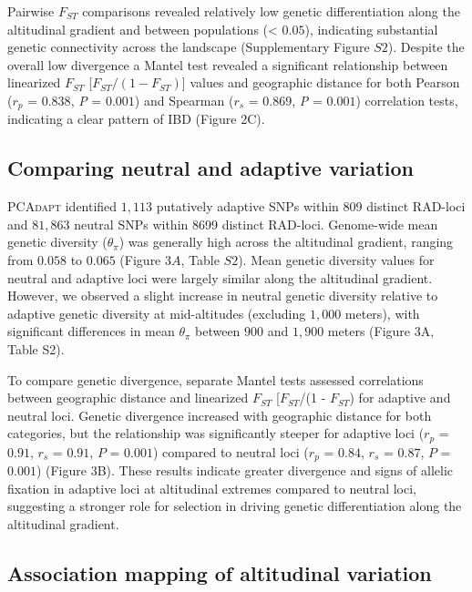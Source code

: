 \documentclass[9pt,a4paper,twoside]{rho-class/rho}
\begin{document}
        Pairwise $F_{ST}$ comparisons revealed relatively low genetic differentiation along the altitudinal gradient and between populations (< $0.05$), indicating substantial genetic connectivity across the landscape (Supplementary Figure $S2$). Despite the overall low divergence a Mantel test revealed a significant relationship between linearized $F_{ST}$  [$F_{ST}/(1 - F_{ST})$] values and geographic distance for both Pearson (\textit{$r_p$} = $0.838$, \textit{P} = $0.001$) and Spearman (\textit{$r_s$} = $0.869$, \textit{P} = $0.001$) correlation tests, indicating a clear pattern of IBD (Figure 2C).

    \subsection{Comparing neutral and adaptive variation}

        \textsc{PCAdapt} identified $1,113$ putatively adaptive SNPs within 809 distinct RAD-loci and $81,863$ neutral SNPs within 8699 distinct RAD-loci. Genome-wide mean genetic diversity ($\theta_\pi$) was generally high across the altitudinal gradient, ranging from $0.058$ to $0.065$ (Figure $3A$, Table $S2$). Mean genetic diversity values for neutral and adaptive loci were largely similar along the altitudinal gradient. However, we observed a slight increase in neutral genetic diversity relative to adaptive genetic diversity at mid-altitudes (excluding $1,000$ meters), with significant differences in mean $\theta_\pi$ between $900$ and $1,900$ meters (Figure 3A, Table S2).
    
        To compare genetic divergence, separate Mantel tests assessed correlations between geographic distance and linearized $F_{ST}$ [$F_{ST}$/(1 - $F_{ST}$) for adaptive and neutral loci. Genetic divergence increased with geographic distance for both categories, but the relationship was significantly steeper for adaptive loci (\textit{$r_p$} = $0.91$, \textit{$r_s$} = $0.91$, \textit{$P$} = $0.001$) compared to neutral loci (\textit{$r_p$} = $0.84$, \textit{$r_s$} = $0.87$, \textit{$P$} = $0.001$) (Figure 3B). These results indicate greater divergence and signs of allelic fixation in adaptive loci at altitudinal extremes compared to neutral loci, suggesting a stronger role for selection in driving genetic differentiation along the altitudinal gradient.

    \subsection{Association mapping of altitudinal variation}
\end{document}
